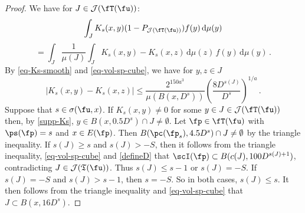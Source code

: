 \begin{proof}
    \leanok
    We have for $J \in \mathcal{J}(\fT(\fu))$:
    $$
        \int_J K_{s}(x,y)(1 - P_{\mathcal{J}(\fT(\fu))})f(y) \, \mathrm{d}\mu(y)
    $$
    \begin{equation}
    \label{eq-canc-comp}
        = \int_J \frac{1}{\mu(J)} \int_J K_s(x,y) - K_s(x,z) \, \mathrm{d}\mu(z) \,f(y) \, \mathrm{d}\mu(y)\,.
    \end{equation}
    By \eqref{eq-Ks-smooth} and \eqref{eq-vol-sp-cube}, we have for $y, z \in J$
    $$
        |K_s(x,y) - K_s(x,z)| \le \frac{2^{150a^3}}{\mu(B(x, D^s))} \left(\frac{8 D^{s(J)}}{D^s}\right)^{1/a}\,.
    $$
    Suppose that $s \in \sigma(\fu, x)$.
    If $K_s(x,y) \ne 0$ for some $y \in J \in \mathcal{J}(\fT(\fu))$ then, by \eqref{supp-Ks}, $y \in B(x, 0.5 D^s) \cap J \ne \emptyset$. Let $\fp \in \fT(\fu)$ with $\ps(\fp) = s$ and $x \in E(\fp)$. Then $B(\pc(\fp_s), 4.5D^s) \cap J \ne \emptyset$ by the triangle inequality. If $s(J) \ge s$ and $s(J) > -S$, then it follows from the triangle inequality, \eqref{eq-vol-sp-cube} and \eqref{defineD} that $\scI(\fp) \subset B(c(J), 100 D^{s(J)+1})$, contradicting $J \in \mathcal{J}(\mathfrak{T}(\fu))$. Thus $s(J) \le s - 1$ or $s(J) = -S$. If $s(J) = -S$ and $s(J) > s - 1$, then $s = -S$. So in both cases, $s(J) \le s$. It then follows from the triangle inequality and \eqref{eq-vol-sp-cube} that $J \subset B(x, 16 D^s)$.


\end{proof}
